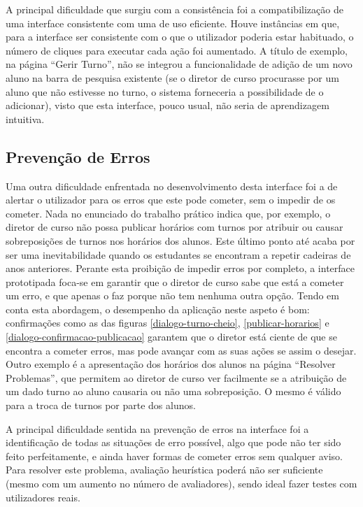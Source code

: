 \documentclass[12pt, a4paper]{article}
\begin{document}
A principal dificuldade que surgiu com a consistência foi a compatibilização de uma interface
consistente com uma de uso eficiente. Houve instâncias em que, para a interface ser consistente com
o que o utilizador poderia estar habituado, o número de cliques para executar cada ação foi
aumentado. A título de exemplo, na página ``Gerir Turno'', não se integrou a funcionalidade de
adição de um novo aluno na barra de pesquisa existente (se o diretor de curso procurasse por um
aluno que não estivesse no turno, o sistema forneceria a possibilidade de o adicionar), visto que
esta interface, pouco usual, não seria de aprendizagem intuitiva.

\subsection{Prevenção de Erros}

Uma outra dificuldade enfrentada no desenvolvimento desta interface foi a de alertar o utilizador
para os erros que este pode cometer, sem o impedir de os cometer. Nada no enunciado do trabalho
prático indica que, por exemplo, o diretor de curso não possa publicar horários com turnos por
atribuir ou causar sobreposições de turnos nos horários dos alunos. Este último ponto até acaba por
ser uma inevitabilidade quando os estudantes se encontram a repetir cadeiras de anos anteriores.
Perante esta proibição de impedir erros por completo, a interface prototipada foca-se em garantir
que o diretor de curso sabe que está a cometer um erro, e que apenas o faz porque não tem nenhuma
outra opção. Tendo em conta esta abordagem, o desempenho da aplicação neste aspeto é bom:
confirmações como as das figuras \ref{dialogo-turno-cheio}, \ref{publicar-horarios} e
\ref{dialogo-confirmacao-publicacao} garantem que o diretor está ciente de que se encontra a cometer
erros, mas pode avançar com as suas ações se assim o desejar. Outro exemplo é a apresentação dos
horários dos alunos na página ``Resolver Problemas'', que permitem ao diretor de curso ver
facilmente se a atribuição de um dado turno ao aluno causaria ou não uma sobreposição. O mesmo é
válido para a troca de turnos por parte dos alunos.

A principal dificuldade sentida na prevenção de erros na interface foi a identificação de todas as
situações de erro possível, algo que pode não ter sido feito perfeitamente, e ainda haver formas
de cometer erros sem qualquer aviso. Para resolver este problema, avaliação heurística poderá não
ser suficiente (mesmo com um aumento no número de avaliadores), sendo ideal fazer testes com
utilizadores reais.
\end{document}
